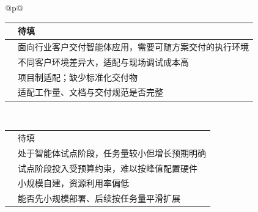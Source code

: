 \begin{longtable}{@{}p{\linewidth}@{}}
\begin{minipage}{\linewidth}
\begin{tabular}{@{}>{\raggedright\arraybackslash}p{}>{\raggedright\arraybackslash}p{}@{}}
\rowcolor{white} \TableHeaderText{访谈时间与方式} & 待填 \\ \hline
\rowcolor{white} \TableHeaderText{当前部署与使用情况} & 面向行业客户交付智能体应用，需要可随方案交付的执行环境 \\ \hline
\rowcolor{white} \TableHeaderText{核心痛点} & 不同客户环境差异大，适配与现场调试成本高 \\ \hline
\rowcolor{white} \TableHeaderText{现有方案与不足} & 项目制适配；缺少标准化交付物 \\ \hline
\rowcolor{white} \TableHeaderText{采购关注点} & 适配工作量、文档与交付规范是否完整 \\ \hline
\end{tabular}
\end{minipage} \\[6pt]
\begin{minipage}{\linewidth}
\begin{tabular}{@{}>{\raggedright\arraybackslash}p{}>{\raggedright\arraybackslash}p{}@{}}
\hline
\rowcolor{WordTableHeader}\multicolumn{2}{@{}p{\linewidth}@{}}{\RecordHeading{编号：I-09\quad 受访角色与企业类型：制造业企业 · 数字化部门}} \\ \hline
\rowcolor{white} \TableHeaderText{访谈时间与方式} & 待填 \\ \hline
\rowcolor{white} \TableHeaderText{当前部署与使用情况} & 处于智能体试点阶段，任务量较小但增长预期明确 \\ \hline
\rowcolor{white} \TableHeaderText{核心痛点} & 试点阶段投入受预算约束，难以按峰值配置硬件 \\ \hline
\rowcolor{white} \TableHeaderText{现有方案与不足} & 小规模自建，资源利用率偏低 \\ \hline
\rowcolor{white} \TableHeaderText{采购关注点} & 能否先小规模部署、后续按任务量平滑扩展 \\ \hline
\end{tabular}
\end{minipage} \\[6pt]
\begin{minipage}{\linewidth}
\begin{tabular}{@{}>{\raggedright\arraybackslash}p{}>{\raggedright\arraybackslash}p{}@{}}
\hline
\rowcolor{WordTableHeader}\multicolumn{2}{@{}p{\linewidth}@{}}{\RecordHeading{编号：I-10\quad 受访角色与企业类型：软件开发企业 · 技术负责人}} \\ \hline

\end{tabular}
\end{minipage}
\end{longtable}
